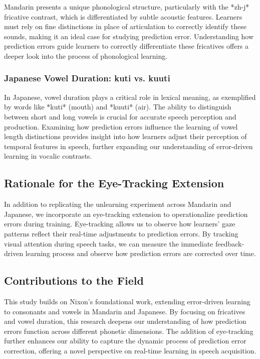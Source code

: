 Mandarin presents a unique phonological structure, particularly with the *zh-j* fricative contrast, which is differentiated by subtle acoustic features. Learners must rely on fine distinctions in place of articulation to correctly identify these sounds, making it an ideal case for studying prediction error. Understanding how prediction errors guide learners to correctly differentiate these fricatives offers a deeper look into the process of phonological learning.

\subsubsection{Japanese Vowel Duration: kuti vs. kuuti}

In Japanese, vowel duration plays a critical role in lexical meaning, as exemplified by words like *kuti* (mouth) and *kuuti* (air). The ability to distinguish between short and long vowels is crucial for accurate speech perception and production. Examining how prediction errors influence the learning of vowel length distinctions provides insight into how learners adjust their perception of temporal features in speech, further expanding our understanding of error-driven learning in vocalic contrasts.

\subsection{Rationale for the Eye-Tracking Extension}

In addition to replicating the unlearning experiment across Mandarin and Japanese, we incorporate an eye-tracking extension to operationalize prediction errors during training. Eye-tracking allows us to observe how learners' gaze patterns reflect their real-time adjustments to prediction errors. By tracking visual attention during speech tasks, we can measure the immediate feedback-driven learning process and observe how prediction errors are corrected over time.

\subsection{Contributions to the Field}

This study builds on Nixon's foundational work, extending error-driven learning to consonants and vowels in Mandarin and Japanese. By focusing on fricatives and vowel duration, this research deepens our understanding of how prediction errors function across different phonetic dimensions. The addition of eye-tracking further enhances our ability to capture the dynamic process of prediction error correction, offering a novel perspective on real-time learning in speech acquisition.

